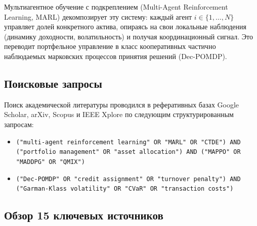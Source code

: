 \documentclass[11pt,a4paper]{article}
\begin{document}
Мультиагентное обучение с подкреплением (Multi-Agent Reinforcement Learning, MARL) декомпозирует эту систему: каждый агент $i \in \{1, \dots, N\}$ управляет долей конкретного актива, опираясь на свои локальные наблюдения (динамику доходности, волатильность) и получая координационный сигнал. Это переводит портфельное управление в класс кооперативных частично наблюдаемых марковских процессов принятия решений (Dec-POMDP).

\subsection{Поисковые запросы}

Поиск академической литературы проводился в реферативных базах Google Scholar, arXiv, Scopus и IEEE Xplore по следующим структурированным запросам:

\begin{itemize}[leftmargin=*]
\item \texttt{("multi-agent reinforcement learning" OR "MARL" OR "CTDE") AND}\\
\texttt{("portfolio management" OR "asset allocation") AND ("MAPPO" OR "MADDPG" OR "QMIX")}
\item \texttt{("Dec-POMDP" OR "credit assignment" OR "turnover penalty") AND}\\
\texttt{("Garman-Klass volatility" OR "CVaR" OR "transaction costs")}
\end{itemize}

\subsection{Обзор 15 ключевых источников}
\end{document}
